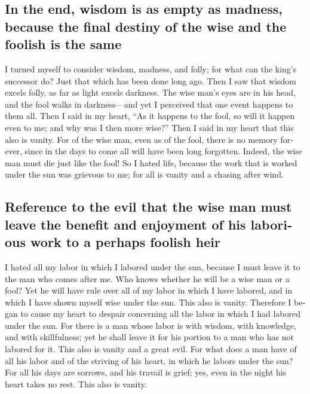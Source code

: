 \begin{paracol}{2}
\begin{otherlanguage}{english}
\hypertarget{in-the-end-wisdom-is-as-empty-as-madness-because-the-final-destiny-of-the-wise-and-the-foolish-is-the-same}{%
\subsection{In the end, wisdom is as empty as madness, because the final
destiny of the wise and the foolish is the
same}\label{in-the-end-wisdom-is-as-empty-as-madness-because-the-final-destiny-of-the-wise-and-the-foolish-is-the-same}}

 I turned myself to consider wisdom, madness, and folly;
for what can the king's successor do? Just that which has been done long
ago.  Then I saw that wisdom excels folly, as far as
light excels darkness.  The wise man's eyes are in his
head, and the fool walks in darkness---and yet I perceived that one
event happens to them all.  Then I said in my heart, ``As
it happens to the fool, so will it happen even to me; and why was I then
more wise?'' Then I said in my heart that this also is vanity.
 For of the wise man, even as of the fool, there is no
memory forever, since in the days to come all will have been long
forgotten. Indeed, the wise man must die just like the fool!
 So I hated life, because the work that is worked under
the sun was grievous to me; for all is vanity and a chasing after wind.

\hypertarget{reference-to-the-evil-that-the-wise-man-must-leave-the-benefit-and-enjoyment-of-his-laborious-work-to-a-perhaps-foolish-heir}{%
\subsection{Reference to the evil that the wise man must leave the
benefit and enjoyment of his laborious work to a perhaps foolish
heir}\label{reference-to-the-evil-that-the-wise-man-must-leave-the-benefit-and-enjoyment-of-his-laborious-work-to-a-perhaps-foolish-heir}}

 I hated all my labor in which I labored under the sun,
because I must leave it to the man who comes after me. 
Who knows whether he will be a wise man or a fool? Yet he will have rule
over all of my labor in which I have labored, and in which I have shown
myself wise under the sun. This also is vanity. 
Therefore I began to cause my heart to despair concerning all the labor
in which I had labored under the sun.  For there is a man
whose labor is with wisdom, with knowledge, and with skillfulness; yet
he shall leave it for his portion to a man who has not labored for it.
This also is vanity and a great evil.  For what does a
man have of all his labor and of the striving of his heart, in which he
labors under the sun?  For all his days are sorrows, and
his travail is grief; yes, even in the night his heart takes no rest.
This also is vanity.


\end{otherlanguage}
\end{paracol}
